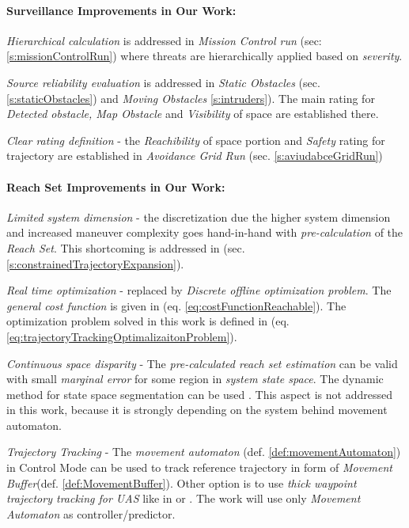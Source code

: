 \paragraph{Surveillance Improvements in Our Work:}

\emph{Hierarchical calculation} is addressed in \emph{Mission Control run} (sec: \ref{s:missionControlRun}) where threats are hierarchically applied based on \emph{severity}.

\emph{Source reliability evaluation} is addressed in \emph{Static Obstacles} (sec. \ref{s:staticObstacles}) and \emph{Moving Obstacles} \ref{s:intruders}). The main rating for \emph{Detected obstacle, Map Obstacle} and \emph{Visibility} of space are established there. 

\emph{Clear rating definition} - the \emph{Reachibility} of space portion and \emph{Safety} rating for trajectory are established in \emph{Avoidance Grid Run} (sec. \ref{s:aviudabceGridRun})

\paragraph{Reach Set Improvements in Our Work:}

\emph{Limited system dimension} - the discretization due the higher system dimension and  increased maneuver complexity goes hand-in-hand with \emph{pre-calculation} of the \emph{Reach Set}. This shortcoming is addressed in (sec. \ref{s:constrainedTrajectoryExpansion}).

\emph{Real time optimization} -  replaced by \emph{Discrete offline optimization problem}. The \emph{general cost function} is given in (eq. \ref{eq:costFunctionReachable}). The optimization problem solved in this work is defined in (eq. \ref{eq:trajectoryTrackingOptimalizaitonProblem}).

\emph{Continuous space disparity} - The \emph{pre-calculated reach set estimation} can be valid with small \emph{marginal error} for some region in \emph{system state space}. The dynamic method for state space segmentation can be used \cite{takahashi1996reasonable}. This aspect is not addressed in this work, because it is strongly depending on the system behind movement automaton. 

\emph{Trajectory Tracking} - The \emph{movement automaton} (def. \ref{def:movementAutomaton}) in Control Mode can be used to track reference trajectory in form of \emph{Movement Buffer}(def. \ref{def:MovementBuffer}). Other option is to use \emph{thick waypoint trajectory tracking for UAS} like in \cite{kaminer1998trajectory} or \cite{murillo2015generalized}. The work will use only \emph{Movement Automaton} as controller/predictor.